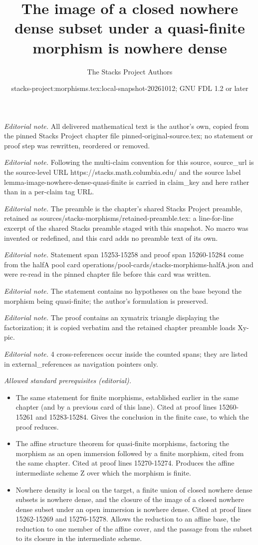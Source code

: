 \documentclass[10pt,a4paper]{amsart}
\title{The image of a closed nowhere dense subset under a quasi-finite morphism is nowhere dense}
\author{The Stacks Project Authors}
\date{stacks-project:morphisms.tex:local-snapshot-20261012; GNU FDL 1.2 or later}
\theoremstyle{plain}
\theoremstyle{definition}
\theoremstyle{remark}
\numberwithin{equation}{subsection}
\begin{document}
\maketitle
\noindent\textit{Editorial note.} All delivered mathematical text is the author's own, copied from the pinned Stacks Project chapter file pinned-original-source.tex; no statement or proof step was rewritten, reordered or removed.\par\medskip
\noindent\textit{Editorial note.} Following the multi-claim convention for this source, source\_url is the source-level URL https://stacks.math.columbia.edu/ and the source label lemma-image-nowhere-dense-quasi-finite is carried in claim\_key and here rather than in a per-claim tag URL.\par\medskip
\noindent\textit{Editorial note.} The preamble is the chapter's shared Stacks Project preamble, retained as sources/stacks-morphisms/retained-preamble.tex: a line-for-line excerpt of the shared Stacks preamble staged with this snapshot. No macro was invented or redefined, and this card adds no preamble text of its own.\par\medskip
\noindent\textit{Editorial note.} Statement span 15253-15258 and proof span 15260-15284 come from the halfA pool card operations/pool-cards/stacks-morphisms-halfA.json and were re-read in the pinned chapter file before this card was written.\par\medskip
\noindent\textit{Editorial note.} The statement contains no hypotheses on the base beyond the morphism being quasi-finite; the author's formulation is preserved.\par\medskip
\noindent\textit{Editorial note.} The proof contains an xymatrix triangle displaying the factorization; it is copied verbatim and the retained chapter preamble loads Xy-pic.\par\medskip
\noindent\textit{Editorial note.} 4 cross-references occur inside the counted spans; they are listed in external\_references as navigation pointers only.\par\medskip
\noindent\textit{Allowed standard prerequisites (editorial).}\begin{itemize}
\item The same statement for finite morphisms, established earlier in the same chapter (and by a previous card of this lane). Cited at proof lines 15260-15261 and 15283-15284. Gives the conclusion in the finite case, to which the proof reduces.
\item The affine structure theorem for quasi-finite morphisms, factoring the morphism as an open immersion followed by a finite morphism, cited from the same chapter. Cited at proof lines 15270-15274. Produces the affine intermediate scheme Z over which the morphism is finite.
\item Nowhere density is local on the target, a finite union of closed nowhere dense subsets is nowhere dense, and the closure of the image of a closed nowhere dense subset under an open immersion is nowhere dense. Cited at proof lines 15262-15269 and 15276-15278. Allows the reduction to an affine base, the reduction to one member of the affine cover, and the passage from the subset to its closure in the intermediate scheme.
\end{itemize}\medskip
\end{document}
